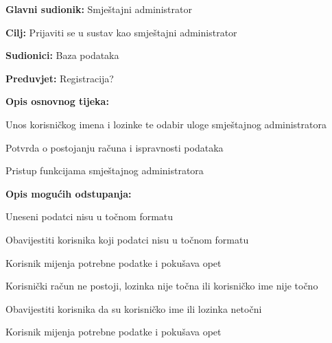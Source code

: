 					\noindent {}
					\begin{packed_item}
						
						\item \textbf{Glavni sudionik: }Smještajni administrator
						\item  \textbf{Cilj:} Prijaviti se u sustav kao smještajni administrator
						\item  \textbf{Sudionici:} Baza podataka
						\item  \textbf{Preduvjet:} Registracija?
						\item  \textbf{Opis osnovnog tijeka:}
						
						\item[] \begin{packed_enum}
							
							\item Unos korisničkog imena i lozinke te odabir uloge smještajnog administratora
							\item Potvrda o postojanju računa i ispravnosti podataka
							\item Pristup funkcijama smještajnog administratora
						\end{packed_enum}
						
						\item  \textbf{Opis mogućih odstupanja:}
						
						\item[] \begin{packed_item}
							
							\item[2.a] Uneseni podatci nisu u točnom formatu
							\item[] \begin{packed_enum}
								
								\item Obavijestiti korisnika koji podatci nisu u točnom formatu
								\item Korisnik mijenja potrebne podatke i pokušava opet
								
							\end{packed_enum}
							\item[2.b] Korisnički račun ne postoji, lozinka nije točna ili korisničko ime nije točno
							\item[] \begin{packed_enum}
								
								\item Obavijestiti korisnika da su korisničko ime ili lozinka netočni
								\item Korisnik mijenja potrebne podatke i pokušava opet
								
							\end{packed_enum}

							
						\end{packed_item}
					\end{packed_item}
				
